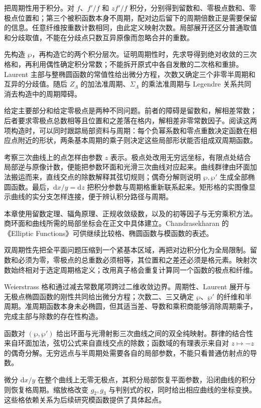 \ProseParagraphBreak
{}把周期性用于积分。对 \(f\)、\(f'/f\) 和 \(zf'/f\) 积分，分别得到留数和、零极点数和、零极点位置和；第三个被积函数本身不周期，配对边后留下的周期倍数正是需要保留的信息。任意纤维按重数计数相同，由此定义映射次数。局部展开还区分普通取值和分歧取值，不能在分歧点只数互异原像而忽略合并的重数。

\ProseParagraphBreak
{}先构造 \(\wp\)，再构造它的两个积分层次。证明周期性时，先求导得到绝对收敛的三次格和，再利用偶性确定积分常数；不能拆开原式中各自发散的二次格和重排。Laurent 主部与整椭圆函数的常值性给出微分方程，次数又确定三个非零半周期和互异的分歧值。随后 \(Z_\Lambda\) 的加法准周期、\(\Sigma_\Lambda\) 的乘法准周期与 Legendre 关系共同消去构造中的周期障碍。

\ProseParagraphBreak
给定主要部分和给定零极点是两种不同问题。前者的障碍是留数和，解相差常数；后者要求零极点总数相等且位置和之差落在格内，解相差非零常数因子。阅读这两项构造时，可以同时跟踪局部资料与周期：每个负幂系数和零点重数决定函数在相应点附近的形状，两条基本周期的乘子则决定这些局部形状能否组成双周期函数。

\ProseParagraphBreak
{}考察三次曲线上的点怎样由参数 \(z\) 表示。极点处改用无穷远坐标，有限点处结合局部逆与原像计数，便能把参数环面和光滑三次曲线对应起来。曲线群律由环面加法搬运而来，直线交点的除数解释其弦切规则；偶奇分解则说明 \(\wp,\wp'\) 生成全部椭圆函数。最后，\(\mathrm{d}x/y=\mathrm{d}z\) 把积分参数与周期格重新联系起来。矩形格的实图像显示曲线的实分支怎样连接，便于辨认积分路径与周期。

\ProseParagraphBreak
本章使用留数定理、辐角原理、正规收敛级数，以及的初等因子与无穷乘积方法。商环面和曲线所需的局部坐标会在正文中具体建立。Chandrasekharan 的《Elliptic Functions》\cite{Chandrasekharan1985Elliptic}可供继续比较格、椭圆函数与模函数的表述。






\begin{chaptersummary}
双周期性先把全平面问题压缩到一个紧基本区域，再把对边积分化为全局限制。留数和必须为零，零极点的总重数必须相等，其位置和之差还必须是格元素。映射次数始终相对于选定周期格定义；改用真子格会重复计算同一个函数的极点和纤维。

\ProseParagraphBreak
Weierstrass 格和通过减去常数尾项跨过二维收敛边界。周期性、Laurent 展开与无极点椭圆函数的刚性共同给出微分方程；次数二、三又确定 \(\wp\)、\(\wp'\) 的纤维和半周期。准周期函数本身未必椭圆，但其适当差、导数和乘积商能够消除周期乘子，完成主部与除数的存在性构造。

\ProseParagraphBreak
函数对 \((\wp,\wp')\) 给出环面与光滑射影三次曲线之间的双全纯映射。群律的结合性来自环面加法，弦切公式来自直线交点的除数；函数域的有理表示来自对 \(z\mapsto-z\) 的偶奇分解。无穷远点与半周期处需要各自的局部参数，不能只看普通仿射点的导数。

\ProseParagraphBreak
微分 \(\mathrm{d}x/y\) 在整个曲线上无零无极点，其积分局部恢复平面参数，沿闭曲线的积分则恢复格周期。缩放格改变 \(g_2,g_3\) 与判别式的权，同时给出相应曲线的坐标变换。这些格依赖关系为后续研究模函数提供了具体起点。
\end{chaptersummary}

